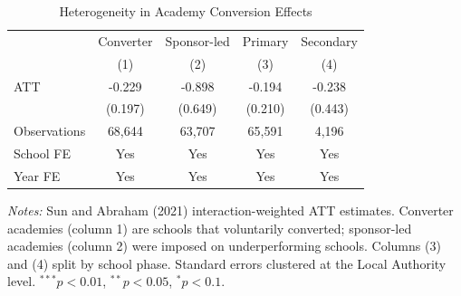 \begin{table}[htbp]
\centering
\caption{Heterogeneity in Academy Conversion Effects}
\label{tab:hetero}
\begin{tabular}{lcccc}
\toprule
 & Converter & Sponsor-led & Primary & Secondary \\
 & (1) & (2) & (3) & (4) \\
\midrule
ATT & -0.229 & -0.898 & -0.194 & -0.238 \\
 & (0.197) & (0.649) & (0.210) & (0.443) \\
\midrule
Observations & 68,644 & 63,707 & 65,591 & 4,196 \\
School FE & Yes & Yes & Yes & Yes \\
Year FE & Yes & Yes & Yes & Yes \\
\bottomrule
\end{tabular}
\begin{tablenotes}
\item \textit{Notes:} Sun and Abraham (2021) interaction-weighted ATT estimates. Converter academies (column 1) are schools that voluntarily converted; sponsor-led academies (column 2) were imposed on underperforming schools. Columns (3) and (4) split by school phase. Standard errors clustered at the Local Authority level. $^{***}p<0.01$, $^{**}p<0.05$, $^{*}p<0.1$.
\end{tablenotes}
\end{table}

